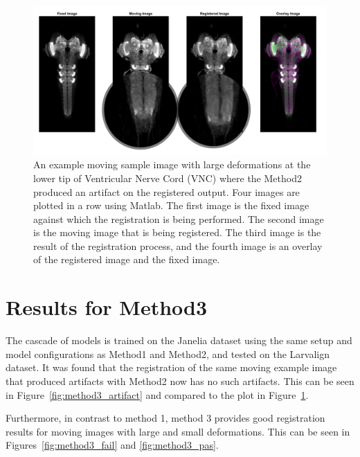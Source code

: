 \documentclass{report}
\begin{document}
	\begin{figure}[h!]
		\centering
		\includegraphics[width=0.9\columnwidth]{resources/chapter4/method2/np_52B07_52H01_MB262B_021713B_scaled.png}
		\caption{An example moving sample image with large deformations at the lower tip of Ventricular Nerve Cord (VNC) where the Method2 produced an artifact on the registered output. Four images are plotted in a row using Matlab. The first image is the fixed image against which the registration is being performed. The second image is the moving image that is being registered. The third image is the result of the registration process, and the fourth image is an overlay of the registered image and the fixed image.}
		\label{fig:method2_artifact}
	\end{figure}
	
	\section{Results for Method3}
	The cascade of models is trained on the Janelia dataset using the same setup and model configurations as Method1 and Method2, and tested on the Larvalign dataset. It was found that the registration of the same moving example image that produced artifacts with Method2 now has no such artifacts. This can be seen in Figure~\ref{fig:method3_artifact} and compared to the plot in Figure~\ref{fig:method2_artifact}.
	
	Furthermore, in contrast to method 1, method 3 provides good registration results for moving images with large and small deformations. This can be seen in Figures~\ref{fig:method3_fail} and \ref{fig:method3_pas}.
	
\end{document}
